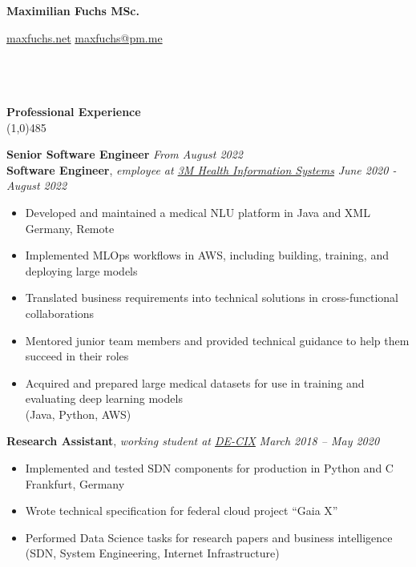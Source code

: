 \documentclass[9pt]{extarticle}
\newcommand\negativespace[1][-0.12cm]{\hspace*{#1}}
\begin{document}
\centerline{{\LARGE \bf Maximilian Fuchs MSc.}}
\centerline{\small \href{https://maxfuchs.net}{maxfuchs.net} \raisebox{0.25ex}{\tiny$\bullet$}  \href{mailto:maxfuchs@pm.me}{maxfuchs@pm.me}}


\noindent %
\\\\\\
\vspace*{-6pt}
{\negativespace \Large \bf Professional Experience}\\
\line(1,0){485}
\\
\noindent

\noindent
{\bf Senior Software Engineer}  \hfill \textit{From August 2022} \\
{\bf Software Engineer}, \textit{employee at \href{https://www.3m.com/3M/en_US/health-information-systems-us/support/international/}{3M Health Information Systems}}  \hfill \textit{June 2020 - August 2022} 
\begin{itemize}
\setlength\itemsep{0.05em}
\item Developed and maintained a medical NLU platform in Java and XML \hfill Germany, Remote \\
\item Implemented MLOps workflows in AWS, including building, training, and deploying large models
\item Translated business requirements into technical solutions in cross-functional collaborations
\item Mentored junior team members and provided technical guidance to help them succeed in their roles
\item Acquired and prepared large medical datasets for use in training and evaluating deep learning models \\
(Java, Python, AWS) \\
\end{itemize}

\noindent
{\bf Research Assistant}, \textit{working student at \href{https://www.de-cix.net/}{DE-CIX}}   \hfill \textit{March 2018 -- May 2020}
\begin{itemize}
\setlength\itemsep{0.05em}
\item Implemented and tested SDN components for production in Python and C \hfill Frankfurt, Germany
\item Wrote technical specification for federal cloud project “Gaia X”
\item Performed Data Science tasks for research papers and business intelligence \\
(SDN, System Engineering, Internet Infrastructure) \\
\end{itemize}
\end{document}
